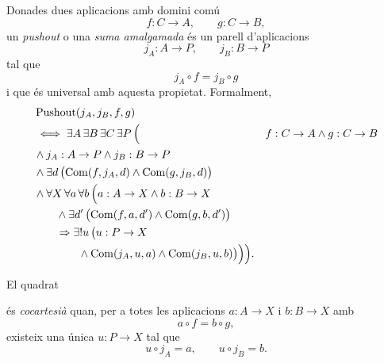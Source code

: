 \begin{definicio}\label{def:pushout}
Donades dues aplicacions amb domini comú
\[
f:C\to A,
\qquad
g:C\to B,
\]
un \emph{pushout} o una \emph{suma amalgamada} és un parell d'aplicacions
\[
j_A:A\to P,
\qquad
j_B:B\to P
\]
tal que
\[
j_A\circ f=j_B\circ g
\]
i que és universal amb aquesta propietat. Formalment,
\[
\begin{aligned}
&\operatorname{Pushout}(j_A,j_B,f,g)\\
&\iff
\exists A\,\exists B\,\exists C\,\exists P\,\Bigl(&
 f:C\to A\land g:C\to B
\\
&{}\land j_A:A\to P\land j_B:B\to P
\\
&{}\land
\exists d\,
 \bigl(\operatorname{Com}(f,j_A,d)\land\operatorname{Com}(g,j_B,d)\bigr)
\\
&{}\land
\forall X\,\forall a\,\forall b\,\Bigl(
 a:A\to X\land b:B\to X
\\
&\qquad{}\land
 \exists d'\,
 \bigl(\operatorname{Com}(f,a,d')\land\operatorname{Com}(g,b,d')\bigr)
\\
&\qquad{}\Rightarrow
 \exists!u\,\bigl(
 u:P\to X
\\
&\qquad\qquad{}\land
 \operatorname{Com}(j_A,u,a)\land\operatorname{Com}(j_B,u,b)
 \bigr)
\Bigr)
\Bigr).
\end{aligned}
\]
\end{definicio}

\begin{notacio}\label{not:pushout}
El quadrat
\begin{center}
\end{center}
és \emph{cocartesià} quan, per a totes les aplicacions \(a:A\to X\) i \(b:B\to X\) amb
\[
a\circ f=b\circ g,
\]
existeix una única \(u:P\to X\) tal que
\[
u\circ j_A=a,
\qquad
u\circ j_B=b.
\]
\end{notacio}

